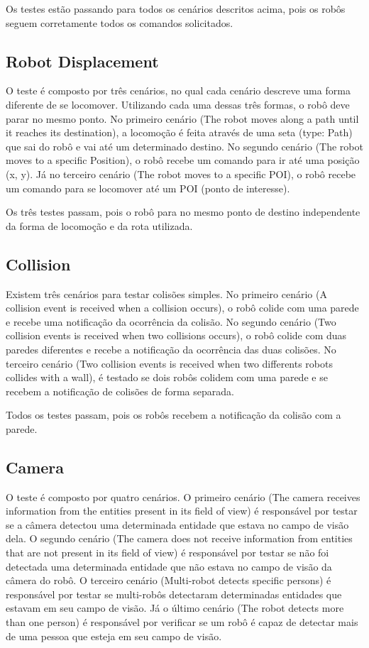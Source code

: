 Os testes estão passando para todos os cenários descritos acima, pois os robôs seguem corretamente todos os comandos solicitados.

\subsection{Robot Displacement}
\label{sec:robotDisplacement}
O teste é composto por três cenários, no qual cada cenário descreve uma forma diferente de se locomover. Utilizando cada uma dessas três formas, o robô deve parar no mesmo ponto. No primeiro cenário (The robot moves along a path until it reaches its destination), a locomoção é feita através de uma seta (type: Path) que sai do robô e vai até um determinado destino. No segundo cenário (The robot moves to a specific Position), o robô recebe um comando para ir até uma posição (x, y). Já no terceiro cenário (The robot moves to a specific POI), o robô recebe um comando para se locomover até um POI (ponto de interesse).

Os três testes passam, pois o robô para no mesmo ponto de destino independente da forma de locomoção e da rota utilizada.

\subsection{Collision}
\label{sec:collision}
Existem três cenários para testar colisões simples. No primeiro cenário (A collision event is received when a collision occurs), o robô colide com uma parede e recebe uma notificação da ocorrência da colisão. No segundo cenário (Two collision events is received when two collisions occurs), o robô colide com duas paredes diferentes e recebe a notificação da ocorrência das duas colisões. No terceiro cenário (Two collision events is received when two differents robots collides with a wall), é testado se dois robôs colidem com uma parede e se  recebem a notificação de colisões de forma separada.

Todos os testes passam, pois os robôs recebem a notificação da colisão com a parede.

\subsection{Camera}
\label{sec:camera}
O teste é composto por quatro cenários. O primeiro cenário (The camera receives information from the entities present in its field of view) é responsável por  testar se a câmera detectou uma determinada entidade que estava no campo de visão dela. O segundo cenário (The camera does not receive information from entities that are not present in its field of view) é responsável  por testar se não foi detectada uma determinada entidade que não estava no campo de visão da câmera do robô. O terceiro cenário (Multi-robot detects specific persons) é responsável por testar se multi-robôs detectaram determinadas entidades que estavam em seu campo de visão. Já o último cenário (The robot detects more than one person) é responsável por verificar se um robô é capaz de detectar mais de uma pessoa que esteja em seu campo de visão.

